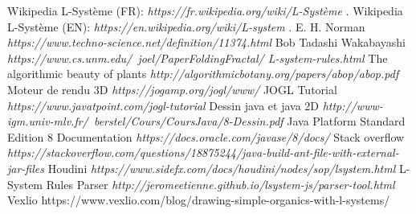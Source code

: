 \documentclass[a4paper,12pt]{report}
\begin{document}
\newcommand{\HRule}{\rule{\linewidth}{0.5mm}}

\newpage

\tableofcontents
\thispagestyle{empty}



\renewcommand{\arraystretch}{1.5}








\begin{thebibliography}{1}
		 Wikipedia L-Système (FR): {\em https://fr.wikipedia.org/wiki/L-Système} .
		 Wikipedia L-Système (EN): {\em https://en.wikipedia.org/wiki/L-system} .
		 E. H. Norman {\em https://www.techno-science.net/definition/11374.html} 		
		 Bob Tadashi Wakabayashi {\em https://www.cs.unm.edu/~joel/PaperFoldingFractal/
		L-system-rules.html}
		 The algorithmic beauty of plants {\em http://algorithmicbotany.org/papers/abop/abop.pdf}
		 Moteur de rendu 3D {\em https://jogamp.org/jogl/www/}
		 JOGL Tutorial { \em https://www.javatpoint.com/jogl-tutorial}
		 Dessin java et java 2D {\em http://www-igm.univ-mlv.fr/~berstel/Cours/CoursJava/8-Dessin.pdf}
		 Java Platform Standard Edition 8 Documentation {\em https://docs.oracle.com/javase/8/docs/}
		 Stack overflow {\em https://stackoverflow.com/questions/18875244/java-build-ant-file-with-external-jar-files}
		 Houdini {\em https://www.sidefx.com/docs/houdini/nodes/sop/lsystem.html}
		 L-System Rules Parser {\em http://jeromeetienne.github.io/lsystem-js/parser-tool.html}
		 Vexlio {https://www.vexlio.com/blog/drawing-simple-organics-with-l-systems/}
		
\end{thebibliography}
\end{document}
